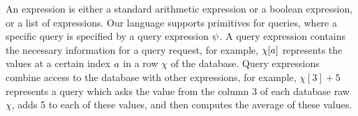 An expression is
either a standard arithmetic expression or a boolean expression, or a list of expressions.
Our language supports primitives for queries, 
where a specific query is specified by a query expression $\psi$. 
A query expression contains the necessary information for a query request, for example, 
$\chi[a]$ represents the values at a certain index $a$ in a row $\chi$ of the database. 
Query expressions combine access to the database with other expressions, 
for example, $\chi[3] + 5$ represents a query which asks the value from the column 3 of each database raw $\chi$, adds 5 to each of these values, 
and then computes the average of these values.


